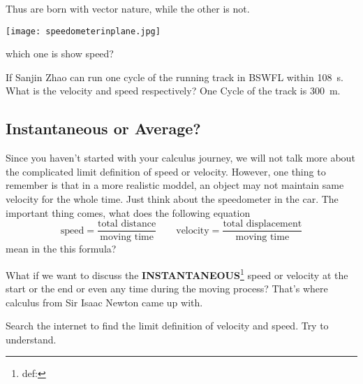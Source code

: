 \documentclass[a4paper]{tufte-handout}
\newenvironment{TaskBox} %
{\begin{tcolorbox}[breakable,colback=b1!30,colframe=b1,title=Task]} {\end{tcolorbox}}
\begin{document}
Thus \uline{\hspace{0.5 in}} are born with vector nature, while the other is not.

\begin{marginfigure}
\texttt{[image: speedometerinplane.jpg]}
\caption{which one is show speed?}
\end{marginfigure}

\begin{TaskBox}
If Sanjin Zhao can run one cycle of the running track in BSWFL within \SI{108}{\s}. What is the velocity and speed respectively? One Cycle of the track is \SI{300}{\m}.
\end{TaskBox}

\subsection{Instantaneous or Average?}
Since you haven't started with your calculus journey, we will not talk more about the complicated limit definition of speed or velocity. However, one thing to remember is that in a more realistic moddel, an object may not maintain same velocity for the whole time. Just think about the speedometer in the car.
The important thing comes, what does the following equation 
\begin{equation*}
  \text{speed} = \frac{\text{total distance}}{\text{moving time}} \qquad  \text{velocity} = \frac{\text{total displacement}}{\text{moving time}}
\end{equation*}
mean in the this formula?

What if we want to discuss the \textbf{INSTANTANEOUS}\footnote{def:} speed or velocity at the start or the end or even any time during the moving process? That's where calculus from Sir Isaac Newton came up with.
\begin{TaskBox}
Search the internet to find the limit definition of velocity and speed. Try to understand. 
\vspace{0.4 in}
\end{TaskBox}
\end{document}
